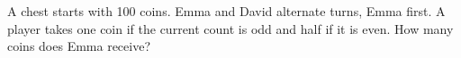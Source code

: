 A chest starts with 100 coins. Emma and David alternate turns, Emma first. A player takes one coin if the current count is odd and half if it is even. How many coins does Emma receive?
